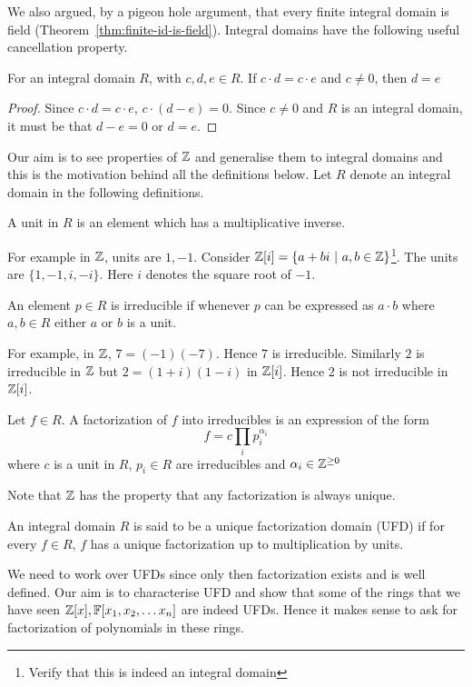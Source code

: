We also argued, by a pigeon hole argument, that every finite integral domain is
field (Theorem~\ref{thm:finite-id-is-field}). Integral domains have the
following useful cancellation property.  
\begin{lemma} \label{lem:id-cancel}
	For an integral domain $R$, with $c,d,e \in R$. If 
	$c\cdot d = c\cdot e$ and $c \ne 0$, then $d=e$
\end{lemma}
\begin{proof}
	Since $c\cdot d = c \cdot e$, $c\cdot (d-e) = 0$. Since $c \ne 0$ and $R$ is
	an integral domain, it must be that $d-e = 0$ or $d=e$.
\end{proof}

Our aim is to see properties of ${\mathbb{Z}}$ and generalise them
to integral domains and this is the motivation behind all the definitions
below. Let $R$ denote an integral domain in the following
definitions.
\begin{definition}[Unit]
	A unit in $R$ is an element which has a multiplicative inverse.
\end{definition}
For example in ${\mathbb{Z}}$, units are $1,-1$. Consider ${\mathbb{Z}}[i] = \{a + bi ~|~ a,b \in
{\mathbb{Z}} \}$\footnote{Verify that this is indeed an integral domain}.  The units are
$\{1,-1,i,-i\}$. Here $i$ denotes the square root of $-1$.
\begin{definition}[Irreducible]
	An element $p \in R$ is irreducible if whenever $p$ can be expressed
	as $a \cdot b$ where $a,b \in R$ either $a$ or $b$ is a unit.
\end{definition}
For example, in ${\mathbb{Z}}$, $7 = (-1)(-7)$. Hence $7$ is irreducible. Similarly $2$
is irreducible in ${\mathbb{Z}}$ but $2 = (1+i)(1-i)$ in ${\mathbb{Z}}[i]$. Hence $2$ is not
irreducible in ${\mathbb{Z}}[i]$.

\begin{definition}[Factorization]
	Let $f \in R$. A factorization of $f$ into irreducibles is an
	expression of the form \[ f = c\prod_i p_i^{\alpha_i}\] where $c$ is a
	unit in $R$, $p_i \in R$ are irreducibles and $\alpha_i \in {\mathbb{Z}}^{\ge
	0}$
\end{definition}

Note that ${\mathbb{Z}}$ has the property that any factorization is always unique.
\begin{definition}
	An integral domain $R$ is said to be a unique factorization domain
	(UFD) if for every $f \in R$, $f$ has a unique factorization up to
	multiplication by units.
\end{definition}
We need to work over UFDs since only then factorization exists and is well
defined.  Our aim is to characterise UFD and show that some of the rings that
we have seen ${\mathbb{Z}}[x], {\mathbb{F}[x_1,x_2, \ldots x_n]}$ are indeed UFDs. Hence it makes sense to ask
for factorization of polynomials in these rings.

